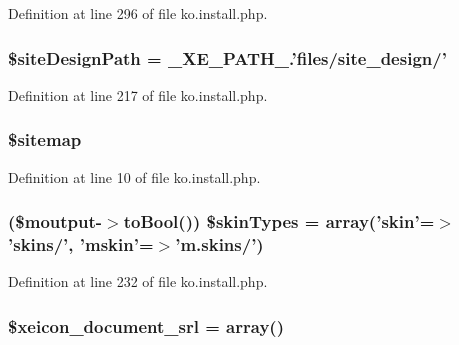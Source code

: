 Definition at line 296 of file ko.\-install.\-php.

\hypertarget{ko_8install_8php_a0b79a974b91157b79d83cc0be7e3247c}{
\subsubsection[{\$site\-Design\-Path}]{\setlength{\rightskip}{0pt plus 5cm}\$site\-Design\-Path = \-\_\-\-X\-E\-\_\-\-P\-A\-T\-H\-\_\-.'files/site\-\_\-design/'}}\label{ko_8install_8php_a0b79a974b91157b79d83cc0be7e3247c}


Definition at line 217 of file ko.\-install.\-php.

\hypertarget{ko_8install_8php_ae7b8fee391a6d8b9162de5b69b9dc07f}{
\subsubsection[{\$sitemap}]{\setlength{\rightskip}{0pt plus 5cm}\$sitemap}}\label{ko_8install_8php_ae7b8fee391a6d8b9162de5b69b9dc07f}


Definition at line 10 of file ko.\-install.\-php.

\hypertarget{ko_8install_8php_aa61073b7b359568eb3459da113fd8cdf}{
\subsubsection[{\$skin\-Types}]{ (\$moutput-\/$>$to\-Bool()) \$skin\-Types = array('{\bf skin}'=$>$'skins/', 'mskin'=$>$'m.\-skins/')}}\label{ko_8install_8php_aa61073b7b359568eb3459da113fd8cdf}


Definition at line 232 of file ko.\-install.\-php.

\hypertarget{ko_8install_8php_a41d95a71ebf0758e83224ab4bb3a31c0}{
\subsubsection[{\$xeicon\-\_\-document\-\_\-srl}]{\setlength{\rightskip}{0pt plus 5cm}\$xeicon\-\_\-document\-\_\-srl = array()}}\label{ko_8install_8php_a41d95a71ebf0758e83224ab4bb3a31c0}


